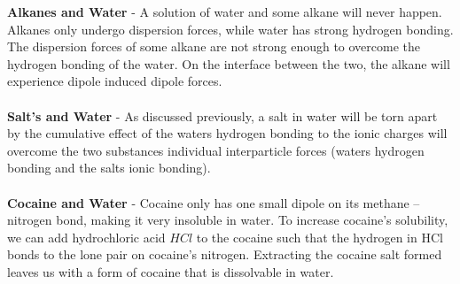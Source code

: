 \documentclass{article}
\begin{document}
	\noindent\textbf{Alkanes and Water} - A solution of water and some alkane will never happen. Alkanes only undergo dispersion forces, while water has strong hydrogen bonding. The dispersion forces of some alkane are not strong enough to overcome the hydrogen bonding of the water. On the interface between the two, the alkane will experience dipole induced dipole forces.\\
	\\
	\textbf{Salt's and Water} - As discussed previously, a salt in water will be torn apart by the cumulative effect of the waters hydrogen bonding to the ionic charges will overcome the two substances individual interparticle forces (waters hydrogen bonding and the salts ionic bonding).\\
	\\
	\textbf{Cocaine and Water} - Cocaine only has one small dipole on its methane -- nitrogen bond, making it very insoluble in water. To increase cocaine's solubility, we can add hydrochloric acid $HCl$ to the cocaine such that the hydrogen in HCl bonds to the lone pair on cocaine's nitrogen. Extracting the cocaine salt formed leaves us with a form of cocaine that is dissolvable in water.
	\begin{qq}
			
\begin{center}
		
	\hspace{20pt}\begin{minipage}{7.2cm}
		
		
	\end{minipage}
		\begin{minipage}{7cm}
			
	
		\end{minipage}
		
		
\end{center}
		
			\end{qq}
\end{document}
